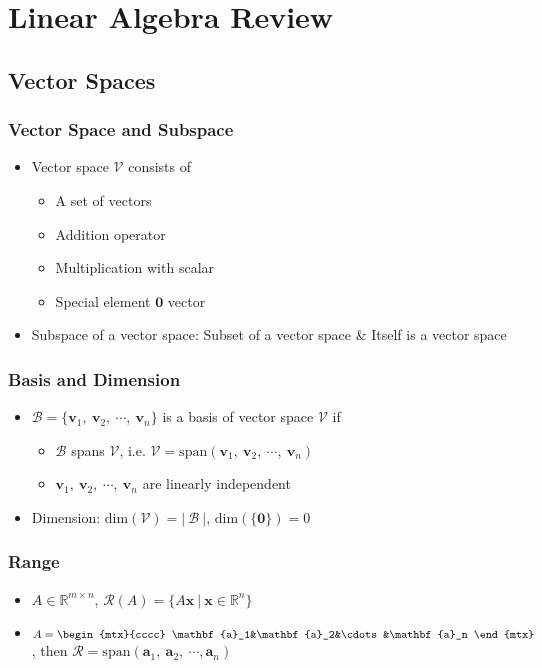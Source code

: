 \section{Linear Algebra Review}

\subsection{Vector Spaces}

\subsubsection*{Vector Space and Subspace}
\begin{itemize}
    \item Vector space $\mathcal{V}$ consists of
    \begin{itemize}
        \item A set of vectors
        \item Addition operator
        \item Multiplication with scalar
        \item Special element $\mathbf{0}$ vector
    \end{itemize}
    \item Subspace of a vector space: Subset of a vector space \& Itself is a vector space
\end{itemize}

\subsubsection*{Basis and Dimension}
\begin{itemize}
    \item $\mathcal{B} = \{\mathbf{v}_1,~\mathbf{v}_2,~\cdots,~\mathbf{v}_n\}$ is a basis of vector space $\mathcal{V}$ if
    \begin{itemize}
        \item $\mathcal{B}$ spans $\mathcal{V}$, i.e. $\mathcal{V} = \mathrm{span}(\mathbf{v}_1,~\mathbf{v}_2,~\cdots,~\mathbf{v}_n)$
        \item $\mathbf{v}_1,~\mathbf{v}_2,~\cdots,~\mathbf{v}_n$ are linearly independent
    \end{itemize}
    \item Dimension: $\mathrm{dim}(\mathcal{V}) = |~\mathcal{B}~|$, $\mathrm{dim}(\{\mathbf{0}\}) = 0$
\end{itemize}

\subsubsection*{Range}
\begin{itemize}
    \item $A \in \mathbb{R}^{m\times n}$, $\mathcal{R}(A) = \{A\mathbf{x}~|~\mathbf{x}\in\mathbb{R}^n\}$
    \item $A = \begin{mtx}{cccc} \mathbf{a}_1&\mathbf{a}_2&\cdots&\mathbf{a}_n \end{mtx}$,
        then $\mathcal{R} = \mathrm{span}(\mathbf{a}_1,~\mathbf{a}_2,~\cdots,\mathbf{a}_n)$
\end{itemize}


